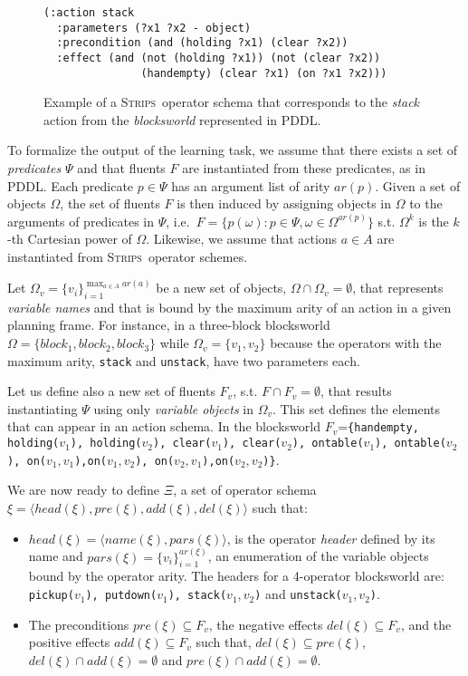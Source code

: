 \documentclass[letterpaper]{article} %
\newcommand{\tup}[1]{{\langle #1 \rangle}}
\newcommand{\strips}{\textsc{Strips}}     %
\begin{document}
\begin{figure}
\begin{scriptsize}
\begin{verbatim}
(:action stack
  :parameters (?x1 ?x2 - object)
  :precondition (and (holding ?x1) (clear ?x2))
  :effect (and (not (holding ?x1)) (not (clear ?x2))
               (handempty) (clear ?x1) (on ?x1 ?x2)))
\end{verbatim}
\end{scriptsize}
 \caption{\small Example of a \strips\ operator schema that corresponds to the {\em stack} action from the {\em blocksworld} represented in PDDL.}
\label{fig:stack}
\end{figure}

To formalize the output of the learning task, we assume that there exists a set of {\em predicates} $\Psi$ and that fluents $F$ are instantiated from these predicates, as in PDDL. Each predicate $p\in\Psi$ has an argument list of arity $ar(p)$. Given a set of objects $\Omega$, the set of fluents $F$ is then induced by assigning objects in $\Omega$ to the arguments of predicates in $\Psi$, i.e.~$F=\{p(\omega):p\in\Psi,\omega\in\Omega^{ar(p)}\}$ s.t. $\Omega^k$ is the $k$-th Cartesian power of $\Omega$. Likewise, we assume that actions $a\in A$ are instantiated from \strips\ operator schemes. 

Let $\Omega_v=\{v_i\}_{i=1}^{\operatorname*{max}_{a\in A} ar(a)}$ be a new set of objects, $\Omega\cap\Omega_v=\emptyset$, that represents {\em variable names} and that is bound by the maximum arity of an action in a given planning frame. For instance, in a three-block blocksworld $\Omega=\{block_1, block_2, block_3\}$ while $\Omega_v=\{v_1, v_2\}$ because the operators with the maximum arity, {\small\tt stack} and {\small\tt unstack}, have two parameters each.

Let us define also a new set of fluents $F_{v}$, s.t. $F\cap F_v=\emptyset$, that results instantiating $\Psi$ using only {\em variable objects} in $\Omega_v$. This set defines the elements that can appear in an action schema. In the blocksworld $F_v$={\small\tt\{handempty, holding($v_1$), holding($v_2$), clear($v_1$), clear($v_2$), ontable($v_1$), ontable($v_2$), on($v_1,v_1$),on($v_1,v_2$), on($v_2,v_1$),on($v_2,v_2$)\}}. 

We are now ready to define $\Xi$, a set of operator schema $\xi=\tup{head(\xi),pre(\xi),add(\xi),del(\xi)}$ such that:
\begin{itemize}
\item $head(\xi)=\tup{name(\xi),pars(\xi)}$, is the operator {\em header} defined by its name and $pars(\xi)=\{v_i\}_{i=1}^{ar(\xi)}$, an enumeration of the variable objects bound by the operator arity. The headers for a 4-operator blocksworld are: {\small\tt pickup($v_1$), putdown($v_1$), stack($v_1,v_2$)} and {\small\tt unstack($v_1,v_2$)}.
\item The preconditions $pre(\xi)\subseteq F_v$, the negative effects $del(\xi)\subseteq F_v$, and the positive effects $add(\xi)\subseteq F_v$ such that, $del(\xi)\subseteq pre(\xi)$, $del(\xi)\cap add(\xi)=\emptyset$ and $pre(\xi)\cap add(\xi)=\emptyset$.
\end{itemize}
\end{document}
